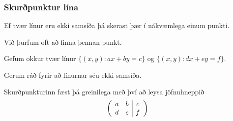 {
	\frametitle{Skurðpunktur lína}
	{
		\item<1-> Ef tvær línur eru ekki samsíða þá skerast þær í nákvæmlega einum punkti.
		\item<2-> Við þurfum oft að finna þennan punkt.
		\item<3-> Gefum okkur tvær línur $\{(x, y) : ax + by=c\}$ og $\{(x, y) : dx + ey=f\}$.
		\item<4-> Gerum ráð fyrir að línurnar séu ekki samsíða.
		\item<5-> Skurðpunkturinn fæst þá greinilega með því að leysa jöfnuhneppið
			\[
				\left (
				\begin{array}{c c | c}
					a & b & c\\
					d & e & f
				\end{array}
				\right )
			\]
	}
}

